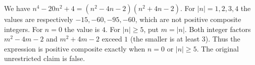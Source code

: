We have $n^4-20n^2+4=(n^2-4n-2)(n^2+4n-2)$. For $|n|=1,2,3,4$ the values are respectively $-15,-60,-95,-60$, which are not positive composite integers. For $n=0$ the value is $4$. For $|n|\ge 5$, put $m=|n|$. Both integer factors $m^2-4m-2$ and $m^2+4m-2$ exceed $1$ (the smaller is at least $3$). Thus the expression is positive composite exactly when $n=0$ or $|n|\ge 5$. The original unrestricted claim is false.

